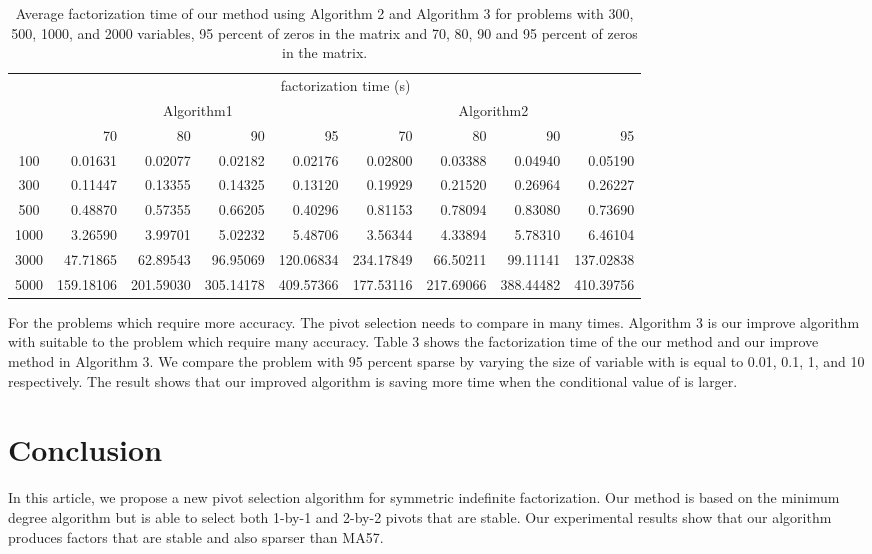 \documentclass{article}
\begin{document}
\ifx
\begin{table}
\caption{Average factorization time of our method using Algorithm 2 and Algorithm 3 for problems with 300, 500, 1000, and 2000 variables, 95 percent of zeros in the matrix and 70, 80, 90 and 95 percent of zeros in the matrix.}
\begin{tabular}{|c|r|r|r|r|r|r|r|r|}
\hline
\multirow{3}{*}{} 
&\multicolumn{8}{c|}{factorization time (s)}\\
\cline{2-9}
&\multicolumn{4}{c|}{Algorithm1}
&\multicolumn{4}{c|}{Algorithm2}\\
\cline{2-9}
&70
&80
&90
&95
&70
&80
&90
&95\\
\hline
100	&	0.01631	&	0.02077	&	0.02182	&	0.02176	&	0.02800	&	0.03388	&	0.04940	&	0.05190	\\													
300	&	0.11447	&	0.13355	&	0.14325	&	0.13120	&	0.19929	&	0.21520	&	0.26964	&	0.26227	\\													
500	&	0.48870	&	0.57355	&	0.66205	&	0.40296	&	0.81153	&	0.78094	&	0.83080	&	0.73690	\\													
1000	&	3.26590	&	3.99701	&	5.02232	&	5.48706	&	3.56344	&	4.33894	&	5.78310	&	6.46104	\\													
3000	&	47.71865	&	62.89543	&	96.95069	&	120.06834	&	234.17849	&	66.50211	&	99.11141	&	137.02838	\\													
5000	&	159.18106	&	201.59030	&	305.14178	&	409.57366	&	177.53116	&	217.69066	&	388.44482	&	410.39756	\\													\hline
\end{tabular}
\end{table}
\fi
\ifx
For the problems which require more accuracy. The pivot selection needs to compare in many times. 
Algorithm 3 is our improve algorithm with suitable to the problem which require many accuracy. 
Table 3 shows the factorization time of the our method and our improve method in Algorithm 3.
We compare the problem with 95 percent sparse by varying the size of variable with  is equal to 0.01, 0.1, 1, and 10 respectively. 
The result shows that our improved algorithm is saving more time when the conditional value of  is larger. 
\fi

\section{Conclusion} \label{sec6}

In this article, we propose a new pivot selection algorithm for symmetric indefinite factorization. Our method is based on the minimum degree algorithm but is able to select both 1-by-1 and 2-by-2 pivots that are stable. Our experimental results show that our algorithm produces factors that are stable and also sparser than MA57.


\end{document}
